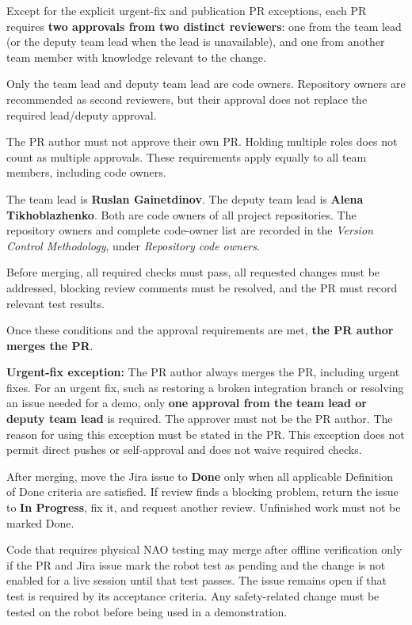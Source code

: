 \documentclass[12pt,a4paper]{article}
\begin{document}
Except for the explicit urgent-fix and publication PR exceptions,
each PR requires \textbf{two approvals from two distinct reviewers}:
one from the team lead (or the deputy team lead when the lead is
unavailable), and one from another team member with knowledge
relevant to the change.

Only the team lead and deputy team lead are code owners.
Repository owners are recommended as second reviewers, but their
approval does not replace the required lead/deputy approval.

The PR author must not approve their own PR. Holding multiple roles does not count as multiple approvals. These requirements apply equally to all team members, including code owners.

The team lead is \textbf{Ruslan Gainetdinov}. The deputy team lead is \textbf{Alena Tikhoblazhenko}. Both are code owners of all project repositories. The repository owners and complete code-owner list are recorded in the \emph{Version Control Methodology}, under \emph{Repository code owners}.

Before merging, all required checks must pass, all requested changes must be addressed, blocking review comments must be resolved, and the PR must record relevant test results.

Once these conditions and the approval requirements are met, \textbf{the PR author merges the PR}.

\textbf{Urgent-fix exception:}
The PR author always merges the PR, including urgent fixes.
For an urgent fix, such as restoring a broken integration branch
or resolving an issue needed for a demo, only \textbf{one approval
from the team lead or deputy team lead} is required.
The approver must not be the PR author.
The reason for using this exception must be stated in the PR.
This exception does not permit direct pushes or self-approval
and does not waive required checks.

After merging, move the Jira issue to \textbf{Done} only when all applicable Definition of Done criteria are satisfied. If review finds a blocking problem, return the issue to \textbf{In Progress}, fix it, and request another review. Unfinished work must not be marked Done.

Code that requires physical NAO testing may merge after offline verification only if the PR and Jira issue mark the robot test as pending and the change is not enabled for a live session until that test passes. The issue remains open if that test is required by its acceptance criteria. Any safety-related change must be tested on the robot before being used in a demonstration.
\end{document}
